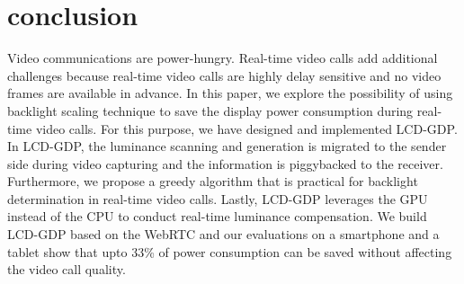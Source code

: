 \section{conclusion}
\label{sec:conclusion}
Video communications are power-hungry. Real-time video calls add additional challenges because real-time video calls are highly delay sensitive and no video frames are available in advance. In this paper, we explore the possibility of using backlight scaling technique to save the display power consumption during real-time video calls. For this purpose, we have designed and implemented LCD-GDP. In LCD-GDP, the luminance scanning and generation is migrated to the sender side during video capturing and the information is piggybacked to the receiver. Furthermore, we propose a greedy algorithm that is practical for backlight determination in real-time video calls. Lastly, LCD-GDP leverages the GPU instead of the CPU to conduct real-time luminance compensation. We build LCD-GDP based on the WebRTC and our evaluations on a smartphone and a tablet show that upto 33\% of power consumption can be saved without affecting the video call quality.


